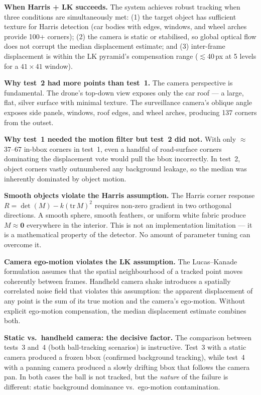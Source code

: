 \documentclass[12pt,a4paper]{article}
\begin{document}
\textbf{When Harris + LK succeeds.} The system achieves robust tracking when three conditions
are simultaneously met: (1) the target object has sufficient texture for Harris detection
(car bodies with edges, windows, and wheel arches provide 100+ corners); (2) the camera is
static or stabilised, so global optical flow does not corrupt the median displacement estimate;
and (3) inter-frame displacement is within the LK pyramid's compensation range ($\lesssim$40\,px
at 5 levels for a $41\times41$ window).

\textbf{Why test~2 had more points than test~1.} The camera perspective is fundamental. The
drone's top-down view exposes only the car roof --- a large, flat, silver surface with minimal
texture. The surveillance camera's oblique angle exposes side panels, windows, roof edges, and
wheel arches, producing 137 corners from the outset.

\textbf{Why test~1 needed the motion filter but test~2 did not.} With only $\approx$37--67
in-bbox corners in test~1, even a handful of road-surface corners dominating the displacement
vote would pull the bbox incorrectly. In test~2, object corners vastly outnumbered any background
leakage, so the median was inherently dominated by object motion.

\textbf{Smooth objects violate the Harris assumption.} The Harris corner response
$R = \det(M) - k(\mathrm{tr}\,M)^2$ requires non-zero gradient in two orthogonal directions.
A smooth sphere, smooth feathers, or uniform white fabric produce $M \approx \mathbf{0}$
everywhere in the interior. This is not an implementation limitation --- it is a mathematical
property of the detector. No amount of parameter tuning can overcome it.

\textbf{Camera ego-motion violates the LK assumption.} The Lucas--Kanade formulation assumes
that the spatial neighbourhood of a tracked point moves coherently between frames. Handheld
camera shake introduces a spatially correlated noise field that violates this assumption:
the apparent displacement of any point is the sum of its true motion and the camera's ego-motion.
Without explicit ego-motion compensation, the median displacement estimate combines both.

\textbf{Static vs.\ handheld camera: the decisive factor.} The comparison between tests~3 and~4
(both ball-tracking scenarios) is instructive. Test~3 with a static camera produced a frozen
bbox (confirmed background tracking), while test~4 with a panning camera produced a slowly
drifting bbox that follows the camera pan. In both cases the ball is not tracked, but the
\emph{nature} of the failure is different: static background dominance vs.\ ego-motion
contamination.
\end{document}
